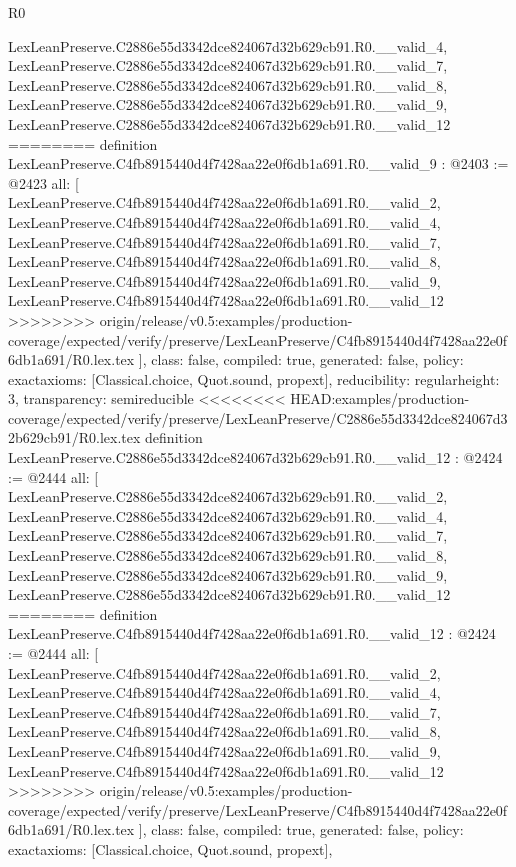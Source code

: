 \begin{lexlean}{R0}
\begin{coremodule}
{{{{{{{{{{{{{{{{{{{{{{{{{{{{{{{{{{{{{{{{{{{{{{{{    LexLeanPreserve.C2886e55d3342dce824067d32b629cb91.R0.__valid_4,
    LexLeanPreserve.C2886e55d3342dce824067d32b629cb91.R0.__valid_7,
    LexLeanPreserve.C2886e55d3342dce824067d32b629cb91.R0.__valid_8,
    LexLeanPreserve.C2886e55d3342dce824067d32b629cb91.R0.__valid_9,
    LexLeanPreserve.C2886e55d3342dce824067d32b629cb91.R0.__valid_12
========
definition LexLeanPreserve.C4fb8915440d4f7428aa22e0f6db1a691.R0.__valid_9 : @2403 := @2423 {
  all: [
    LexLeanPreserve.C4fb8915440d4f7428aa22e0f6db1a691.R0.__valid_2,
    LexLeanPreserve.C4fb8915440d4f7428aa22e0f6db1a691.R0.__valid_4,
    LexLeanPreserve.C4fb8915440d4f7428aa22e0f6db1a691.R0.__valid_7,
    LexLeanPreserve.C4fb8915440d4f7428aa22e0f6db1a691.R0.__valid_8,
    LexLeanPreserve.C4fb8915440d4f7428aa22e0f6db1a691.R0.__valid_9,
    LexLeanPreserve.C4fb8915440d4f7428aa22e0f6db1a691.R0.__valid_12
>>>>>>>> origin/release/v0.5:examples/production-coverage/expected/verify/preserve/LexLeanPreserve/C4fb8915440d4f7428aa22e0f6db1a691/R0.lex.tex
  ],
  class: false,
  compiled: true,
  generated: false,
  policy: exact{axioms: [Classical.choice, Quot.sound, propext]},
  reducibility: regular{height: 3},
  transparency: semireducible
}
<<<<<<<< HEAD:examples/production-coverage/expected/verify/preserve/LexLeanPreserve/C2886e55d3342dce824067d32b629cb91/R0.lex.tex
definition LexLeanPreserve.C2886e55d3342dce824067d32b629cb91.R0.__valid_12 : @2424 := @2444 {
  all: [
    LexLeanPreserve.C2886e55d3342dce824067d32b629cb91.R0.__valid_2,
    LexLeanPreserve.C2886e55d3342dce824067d32b629cb91.R0.__valid_4,
    LexLeanPreserve.C2886e55d3342dce824067d32b629cb91.R0.__valid_7,
    LexLeanPreserve.C2886e55d3342dce824067d32b629cb91.R0.__valid_8,
    LexLeanPreserve.C2886e55d3342dce824067d32b629cb91.R0.__valid_9,
    LexLeanPreserve.C2886e55d3342dce824067d32b629cb91.R0.__valid_12
========
definition LexLeanPreserve.C4fb8915440d4f7428aa22e0f6db1a691.R0.__valid_12 : @2424 := @2444 {
  all: [
    LexLeanPreserve.C4fb8915440d4f7428aa22e0f6db1a691.R0.__valid_2,
    LexLeanPreserve.C4fb8915440d4f7428aa22e0f6db1a691.R0.__valid_4,
    LexLeanPreserve.C4fb8915440d4f7428aa22e0f6db1a691.R0.__valid_7,
    LexLeanPreserve.C4fb8915440d4f7428aa22e0f6db1a691.R0.__valid_8,
    LexLeanPreserve.C4fb8915440d4f7428aa22e0f6db1a691.R0.__valid_9,
    LexLeanPreserve.C4fb8915440d4f7428aa22e0f6db1a691.R0.__valid_12
>>>>>>>> origin/release/v0.5:examples/production-coverage/expected/verify/preserve/LexLeanPreserve/C4fb8915440d4f7428aa22e0f6db1a691/R0.lex.tex
  ],
  class: false,
  compiled: true,
  generated: false,
  policy: exact{axioms: [Classical.choice, Quot.sound, propext]},
}}}}}}}}}}}}}}}}}}}}}}}}}}}}}}}}}}}}}}}}}}}}}}}}}}
\end{coremodule}
\end{lexlean}
